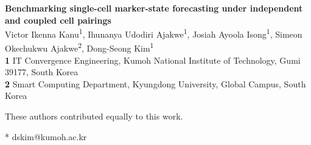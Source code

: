 \documentclass[10pt,letterpaper]{article}
\begin{document}
\vspace*{0.2in}

\begin{flushleft}
{\Large
\textbf{Benchmarking single-cell marker-state forecasting under independent and coupled cell pairings}
}
\newline
\\
Victor Ikenna Kanu\textsuperscript{1\Yinyang},
Ihunanya Udodiri Ajakwe\textsuperscript{1\Yinyang},
Josiah Ayoola Isong\textsuperscript{1\Yinyang},
Simeon Okechukwu Ajakwe\textsuperscript{2\Yinyang},
Dong-Seong Kim\textsuperscript{1\Yinyang*}
\\
\bigskip
\textbf{1} IT Convergence Engineering, Kumoh National Institute of Technology, Gumi 39177, South Korea
\\
\textbf{2} Smart Computing Department, Kyungdong University, Global Campus, South Korea
\\
\bigskip

\Yinyang These authors contributed equally to this work.

* dskim@kumoh.ac.kr


\end{flushleft}
\end{document}
